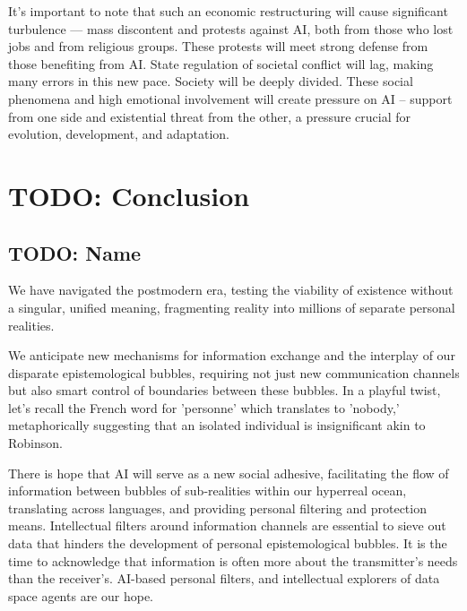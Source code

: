 \documentclass[11pt,a4]{article}
\begin{document}
    \par
    It's important to note that such an economic restructuring will cause significant turbulence — mass discontent and protests against AI, both from those who lost jobs and from religious groups. These protests will meet strong defense from those benefiting from AI. State regulation of societal conflict will lag, making many errors in this new pace. Society will be deeply divided. These social phenomena and high emotional involvement will create pressure on AI – support from one side and existential threat from the other, a pressure crucial for evolution, development, and adaptation.


\section{TODO: Conclusion}
    \subsection{TODO: Name}
    We have navigated the postmodern era, testing the viability of existence without a singular, unified meaning, fragmenting reality into millions of separate personal realities.
    \par
    We anticipate new mechanisms for information exchange and the interplay of our disparate epistemological bubbles, requiring not just new communication channels but also smart control of boundaries between these bubbles.
    In a playful twist, let's recall the French word for 'personne' which translates to 'nobody,' metaphorically suggesting that an isolated individual is insignificant akin to Robinson.
    \par
    There is hope that AI will serve as a new social adhesive, facilitating the flow of information between bubbles of sub-realities within our hyperreal ocean, translating across languages, and providing personal filtering and protection means. Intellectual filters around information channels are essential to sieve out data that hinders the development of personal epistemological bubbles. It is the time to acknowledge that information is often more about the transmitter's needs than the receiver's.  AI-based personal filters, and intellectual explorers of data space agents are our hope.
\end{document}
